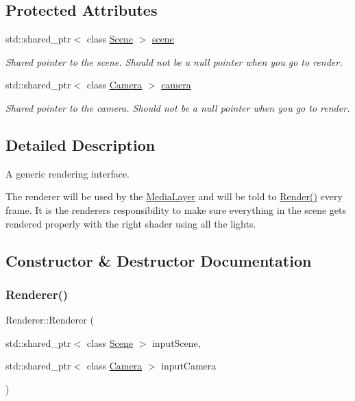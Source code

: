 \subsection*{Protected Attributes}
\begin{DoxyCompactItemize}
\item
std\+::shared\+\_\+ptr$<$ class \hyperlink{class_scene}{Scene} $>$ \hyperlink{class_renderer_a65178695d48824d3afd6fe40fd4915b6}{scene}
\begin{DoxyCompactList}\small\item\em Shared pointer to the scene. Should not be a null pointer when you go to render. \end{DoxyCompactList}\item
std\+::shared\+\_\+ptr$<$ class \hyperlink{class_camera}{Camera} $>$ \hyperlink{class_renderer_a7a08c6489c1ffe8e346b9f205b4014ca}{camera}
\begin{DoxyCompactList}\small\item\em Shared pointer to the camera. Should not be a null pointer when you go to render. \end{DoxyCompactList}\end{DoxyCompactItemize}


\subsection{Detailed Description}
A generic rendering interface.

The renderer will be used by the \hyperlink{class_media_layer}{Media\+Layer} and will be told to \hyperlink{class_renderer_a38623da22aa718cfa41e2514ebd269f5}{Render()} every frame. It is the renderer\textquotesingle{}s responsibility to make sure everything in the scene gets rendered properly with the right shader using all the lights.

\subsection{Constructor \& Destructor Documentation}
\hypertarget{class_renderer_adc8ce31cd649bdf220ca8355809b1d06}{}\label{class_renderer_adc8ce31cd649bdf220ca8355809b1d06}
\subsubsection{\texorpdfstring{Renderer()}{Renderer()}}
{\footnotesize\ttfamily Renderer\+::\+Renderer (\begin{DoxyParamCaption}\item[{std\+::shared\+\_\+ptr$<$ class \hyperlink{class_scene}{Scene} $>$}]{input\+Scene,  }\item[{std\+::shared\+\_\+ptr$<$ class \hyperlink{class_camera}{Camera} $>$}]{input\+Camera }\end{DoxyParamCaption})}



